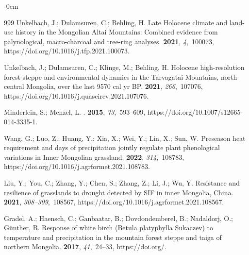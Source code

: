 \documentclass[geosciences,article,accept,pdftex,oneauthor]{Definitions/mdpi}
\begin{document}
\begin{adjustwidth}{-\extralength}{0cm}
\begin{thebibliography}{999}
Unkelbach, J.; Dulamsuren, C.; Behling, H.
\newblock Late Holocene climate and land-use history in the Mongolian Altai
  Mountains: Combined evidence from palynological, macro-charcoal and tree-ring
  analyses.
 {\bf 2021}, {\em 4},~100073, https://doi.org/10.1016/j.tfp.2021.100073.

Unkelbach, J.; Dulamsuren, C.; Klinge, M.; Behling, H.
\newblock Holocene high-resolution forest-steppe and environmental dynamics in
  the Tarvagatai Mountains, north-central Mongolia, over the last 9570 cal yr
  BP.
 {\bf 2021}, {\em 266},~107076, https://doi.org/10.1016/j.quascirev.2021.107076.

Minderlein, S.; Menzel, L.
.
 {\bf 2015}, {\em 73},~593--609, https://doi.org/10.1007/s12665-014-3335-1.

Wang, G.; Luo, Z.; Huang, Y.; Xia, X.; Wei, Y.; Lin, X.; Sun, W.
\newblock Preseason heat requirement and days of precipitation jointly regulate
  plant phenological variations in Inner Mongolian grassland.
 {\bf 2022}, {\em
  314},~108783, https://doi.org/10.1016/j.agrformet.2021.108783.

Liu, Y.; You, C.; Zhang, Y.; Chen, S.; Zhang, Z.; Li, J.; Wu, Y.
\newblock Resistance and resilience of grasslands to drought detected by SIF in
  inner Mongolia, China.
 {\bf 2021}, {\em
  308--309},~108567, https://doi.org/10.1016/j.agrformet.2021.108567.

Gradel, A.; Haensch, C.; Ganbaatar, B.; Dovdondemberel, B.; Nadaldorj, O.;
  Günther, B.
\newblock Response of white birch (Betula platyphylla Sukaczev) to temperature
  and precipitation in the mountain forest steppe and taiga of northern
  Mongolia.
 {\bf 2017}, {\em 41},~24--33,
  https://doi.org/{\href{https://doi.org/10.1016/j.dendro.2016.03.005}{}}.


\end{thebibliography}
\end{adjustwidth}
\end{document}
